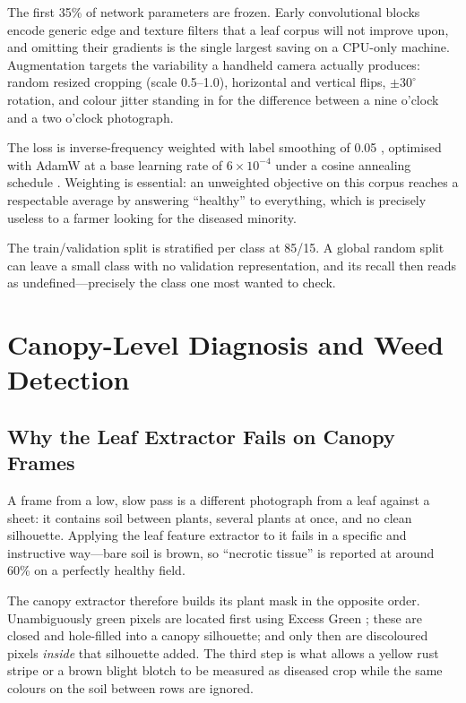 \documentclass[conference]{IEEEtran}
\begin{document}
The first 35\% of network parameters are frozen. Early convolutional blocks
encode generic edge and texture filters that a leaf corpus will not improve
upon, and omitting their gradients is the single largest saving on a CPU-only
machine. Augmentation targets the variability a handheld camera actually
produces: random resized cropping (scale 0.5--1.0), horizontal and vertical
flips, $\pm30^\circ$ rotation, and colour jitter standing in for the difference
between a nine o'clock and a two o'clock photograph.

The loss is inverse-frequency weighted with label smoothing of 0.05
\cite{szegedy2016}, optimised with AdamW \cite{loshchilov2019} at a base
learning rate of $6\times10^{-4}$ under a cosine annealing schedule
\cite{loshchilov2017}. Weighting is essential: an unweighted objective on this
corpus reaches a respectable average by answering ``healthy'' to everything,
which is precisely useless to a farmer looking for the diseased minority.

The train/validation split is stratified per class at 85/15. A global random
split can leave a small class with no validation representation, and its recall
then reads as undefined---precisely the class one most wanted to check.

\section{Canopy-Level Diagnosis and Weed Detection}

\subsection{Why the Leaf Extractor Fails on Canopy Frames}

A frame from a low, slow pass is a different photograph from a leaf against a
sheet: it contains soil between plants, several plants at once, and no clean
silhouette. Applying the leaf feature extractor to it fails in a specific and
instructive way---bare soil is brown, so ``necrotic tissue'' is reported at
around 60\% on a perfectly healthy field.

The canopy extractor therefore builds its plant mask in the opposite order.
Unambiguously green pixels are located first using Excess Green
\cite{woebbecke1995}; these are closed and hole-filled into a canopy
silhouette; and only then are discoloured pixels \emph{inside} that silhouette
added. The third step is what allows a yellow rust stripe or a brown blight
blotch to be measured as diseased crop while the same colours on the soil
between rows are ignored.
\end{document}
